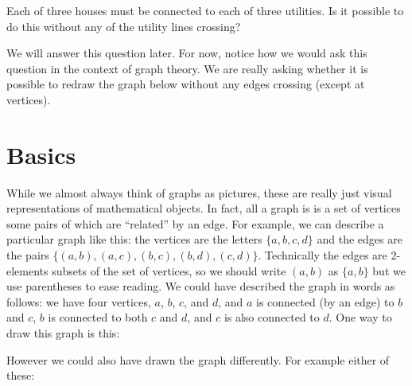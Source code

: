 \documentclass[12pt]{article}
\begin{document}
\begin{example}
  Each of three houses must be connected to each of three utilities.  Is it possible to do this without any of the utility lines crossing?
  \begin{solution}
    We will answer this question later.  For now, notice how we would ask this question in the context of graph theory.  We are really asking whether it is possible to redraw the graph below without any edges crossing (except at vertices).
    
    \begin{center}
    \end{center}

  \end{solution}

\end{example}

\section{Basics}

While we almost always think of graphs as pictures, these are really just visual representations of mathematical objects.  In fact, all a graph is is a set of vertices some pairs of which are ``related'' by an edge.  For example, we can describe a particular graph like this: the vertices are the letters $\{a,b,c,d\}$ and the edges are the pairs $\{(a,b), (a,c), (b,c), (b,d), (c,d)\}$.  Technically the edges are 2-elements subsets of the set of vertices, so we should write $(a,b)$ as $\{a,b\}$ but we use parentheses to ease reading.  We could have described the graph in words as follows: we have four vertices, $a$, $b$, $c$, and $d$, and $a$ is connected (by an edge) to $b$ and $c$, $b$ is connected to both $c$ and $d$, and $c$ is also connected to $d$.  One way to draw this graph is this:
\begin{center}
\end{center}

However we could also have drawn the graph differently.  For example either of these:
\end{document}

